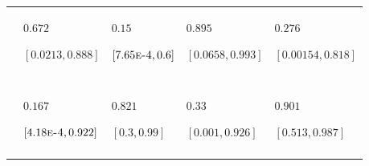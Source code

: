\begin{table}
\begin{tabular}{>{\raggedleft\arraybackslash}m{1.2cm}>{\raggedright\arraybackslash}m{2.3cm}>{\raggedright\arraybackslash}m{2.3cm}>{\raggedright\arraybackslash}m{2.3cm}>{\raggedright\arraybackslash}m{2.3cm}}
\hspace{1em}\cellcolor{blue!5!white!90!black}{$\gamma_{L_{\infty}}$} & $0.672$\par $[0.0213,0.888]$ & $0.15$\par $[7.65\text{\textsc{e-4}},0.6]$ & $0.895$\par $[0.0658,0.993]$ & $0.276$\par $[0.00154,0.818]$\\
\addlinespace[0.3em]
\multicolumn{5}{l}{\cellcolor{blue!5!white!90!black}{\textbf{$\iota$-decomposition}}}\\
\hspace{1em}\cellcolor{blue!5!white!90!black}{$\iota_{L_{0}}$} & \cellcolor{gray}{$0.0157$\par $[0.00665,0.149]$} & \cellcolor{gray}{$0.0078$\par $[0.0036,0.0243]$} & \cellcolor{gray}{$0.0446$\par $[0.0172,0.308]$} & \cellcolor{gray}{$0.0143$\par $[0.00711,0.0524]$}\\
\hspace{1em}\cellcolor{blue!5!white!90!black}{$\iota_{k}$} & $0.167$\par $[4.18\text{\textsc{e-4}},0.922]$ & $0.821$\par $[0.3,0.99]$ & $0.33$\par $[0.001,0.926]$ & $0.901$\par $[0.513,0.987]$\\
\hspace{1em}\cellcolor{blue!5!white!90!black}{$\iota_{L_{\infty}}$} & \cellcolor{gray}{$0.81$\par $[0.0349,0.985]$} & \cellcolor{gray}{$0.17$\par $[8.75\text{\textsc{e-4}},0.686]$} & \cellcolor{gray}{$0.612$\par $[0.0152,0.95]$} & \cellcolor{gray}{$0.0841$\par $[3.65\text{\textsc{e-4}},0.449]$}\\
\bottomrule
\end{tabular}
\end{table}